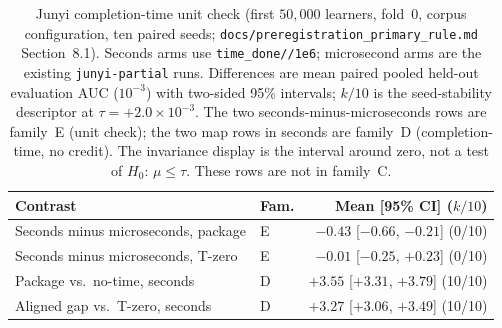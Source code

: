 \begin{table}[tbp]
\caption{Junyi completion-time unit check (first $50{,}000$ learners,
fold~0, corpus configuration, ten paired seeds;
\texttt{docs/preregistration\_primary\_rule.md} Section~8.1).
Seconds arms use \texttt{time\_done//1e6}; microsecond arms are the
existing \texttt{junyi-partial} runs. Differences are mean paired
pooled held-out evaluation AUC ($10^{-3}$) with two-sided 95\%
intervals; $k/10$ is the seed-stability descriptor at
$\tau{=}{+}2.0\times 10^{-3}$. The two seconds-minus-microseconds
rows are family~E (unit check); the two map rows in seconds are
family~D (completion-time, no credit). The invariance display is the
interval around zero, not a test of $H_0{:}\,\mu\le\tau$. These rows
are not in family~C.}
\label{tab:junyi-sec}
\centering
\footnotesize
\setlength{\tabcolsep}{3pt}
\begin{tabular}{@{}llr@{}}
\toprule
Contrast & Fam. & Mean [95\% CI] ($k/10$) \\
\midrule
Seconds minus microseconds, package & E & $-0.43$ [$-0.66$, $-0.21$] (0/10) \\
Seconds minus microseconds, T-zero & E & $-0.01$ [$-0.25$, $+0.23$] (0/10) \\
Package vs.\ no-time, seconds & D & $+3.55$ [$+3.31$, $+3.79$] (10/10) \\
Aligned gap vs.\ T-zero, seconds & D & $+3.27$ [$+3.06$, $+3.49$] (10/10) \\
\bottomrule
\end{tabular}
\end{table}
